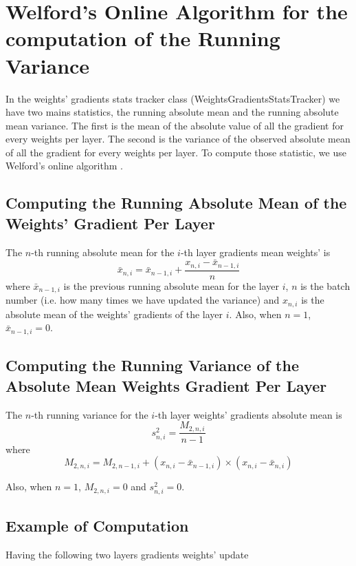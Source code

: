 \documentclass[10pt, a4paper]{article}
\begin{document}
\section*{Welford's Online Algorithm for the computation of the Running Variance}
In the weights' gradients stats tracker class (WeightsGradientsStatsTracker) we have two mains statistics, the running absolute mean and the running absolute mean variance. The first is the mean of the absolute value of all the gradient for every weights per layer. The second is the variance of the observed absolute mean of all the gradient for every weights per layer. To compute those statistic, we use Welford's online algorithm \cite{doi:10.1080/00401706.1962.10490022}. 

\subsection*{Computing the Running Absolute Mean of the Weights' Gradient Per Layer}
The $n$-th running absolute mean for the $i$-th layer gradients mean weights' is
\begin{equation*}
\bar{x}_{n, i} = \bar{x}_{n - 1 , i} + \frac{x_{n, i} - \bar{x}_{n - 1, i} }{n}
\end{equation*}	
where $\bar{x}_{n - 1, i}$ is the previous running absolute mean for the layer $i$, $n$ is the batch number (i.e. how many times we have updated the variance) and $x_{n, i}$ is the absolute mean of the weights' gradients of the layer $i$. Also, when $n = 1$, $\bar{x}_{n - 1, i} = 0$.

\subsection*{Computing the Running Variance of the Absolute Mean Weights Gradient Per Layer}
The $n$-th running variance for the $i$-th layer weights' gradients absolute mean is
\begin{equation*}
s^2_{n, i} = \frac{M_{2, n, i}}{n - 1}
\end{equation*}	
where
\begin{equation*}
M_{2, n, i} = M_{2, n- 1, i} + (x_{n, i} - \bar{x}_{n-1, i}) \times (x_{n, i} - \bar{x}_{n, i})
\end{equation*}

Also, when $n = 1$, $M_{2, n, i} = 0$ and $s^2_{n, i} = 0$.

\subsection*{Example of Computation}
Having the following two layers gradients weights' update
\end{document}
